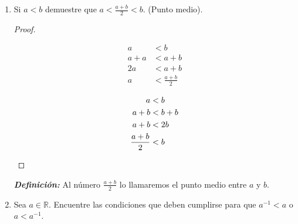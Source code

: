 \documentclass[11pt]{article}
\newcommand{\R}{\mathbb{R}}
\newcommand{\bfit}[1]{\textbf{\textit{#1}}}
\begin{document}
\begin{enumerate}[label=\alph*)]
        \item Si $a<b$ demuestre que $a<\frac{a+b}{2}<b$. (Punto medio).
        \vspace{-1em}\begin{proof} \leavevmode%
            \begin{center}\vspace{-4em}
            \begin{minipage}[t]{.3\linewidth}
            \begin{align*}
            a &< b \\
            a + a &< a+b \\
            2a &< a+b \\
            a &< \frac{a+b}{2}
            \end{align*}
            \end{minipage}%
            \begin{minipage}[t]{.3\linewidth}
            \begin{align*}
            a &< b \\
            a + b &< b+b \\
            a +b &< 2b \\
            \frac{a+b}{2} &< b \qedhere
            \end{align*}
            \end{minipage}%
            \end{center}%
        \end{proof} \vspace{-1em}
        \bfit{Definición:}  Al número $\frac{a+b}{2}$ lo llamaremos el punto medio entre $a$ y $b$.

\pagebreak

    \item Sea $a\in \R$. Encuentre las condiciones que deben cumplirse para que $a^{-1}<a$ o $a<a^{-1}$.
    

\end{enumerate}
\end{document}
